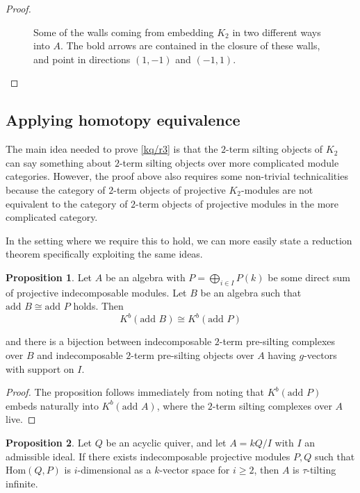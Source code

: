 \documentclass[]{article}
\theoremstyle{definition}
\newtheorem{proposition}{Proposition}[section]
\newcommand{\tu}{\ensuremath{\tau}}
\begin{document}
\begin{proof}
\begin{figure}[h]
\begin{center}
		\end{center}
		\caption{Some of the walls coming from embedding $K_2$ in two different ways into $A$. The bold arrows are contained in the closure of these walls, and point in directions $(1,-1)$ and $(-1,1)$.}
		\label{walls-k2-k2}
	\end{figure}
	
	
\end{proof}

\subsection{Applying homotopy equivalence}
The main idea needed to prove \cref{kq/r3} is that the $2$-term silting objects of $K_2$ can say something about $2$-term silting objects over more complicated module categories. However, the proof above also requires some non-trivial technicalities because the category of $2$-term objects of projective $K_2$-modules are not equivalent to the category of $2$-term objects of projective modules in the more complicated category.

In the setting where we require this to hold, we can more easily state a reduction theorem specifically exploiting the same ideas.

\begin{proposition}\label{silting-equivalence}
	Let $A$ be an algebra with $P = \bigoplus_{i \in I} P(k)$ be some direct sum of projective indecomposable modules. Let $B$ be an algebra such that $\text{add } B \cong \text{add } P$ holds. Then
	\[K^b(\text{add } B) \cong K^b(\text{add } P)\]
	
	and there is a bijection between indecomposable $2$-term pre-silting complexes over $B$ and indecomposable $2$-term pre-silting objects over $A$ having $g$-vectors with support on $I$.
\end{proposition}

\begin{proof}
	 The proposition follows immediately from noting that $K^b(\text{add } P)$ embeds naturally into $K^b(\text{add } A)$, where the $2$-term silting complexes over $A$ live.
\end{proof}

\begin{proposition}
	Let $Q$ be an acyclic quiver, and let $A = kQ/I$ with $I$ an admissible ideal. If there exists indecomposable projective modules $P,Q$ such that $\text{Hom}(Q,P)$ is $i$-dimensional as a $k$-vector space for $i \geq 2$, then $A$ is $\tu$-tilting infinite.
\end{proposition}
\end{document}

